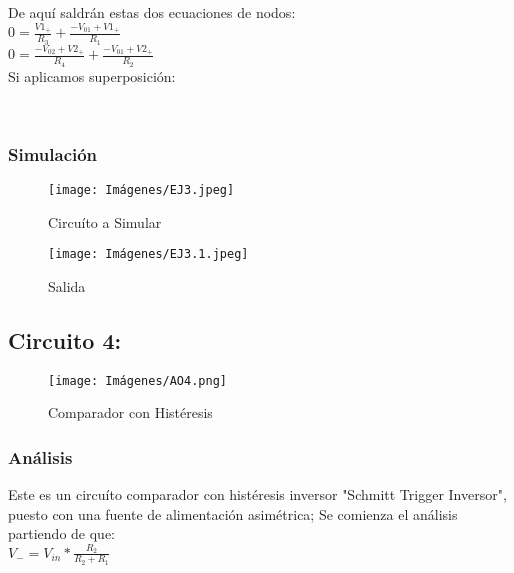         De aquí saldrán estas dos ecuaciones de nodos:\\
        
        $0 = \frac{V1_{+}}{R_{3}} + \frac{-V_{01} + V1_{+}}{R_{1}}$\\
        
        $0 = \frac{-V_{02} + V2_{+}}{R_{4}} + \frac{-V_{01} + V2_{+}}{R_{2}}$\\

        Si aplicamos superposición:\\

        \begin{center}
            \\
        \end{center}
        
        
        \subsubsection{Simulación}
        
        \begin{figure}[ht]
        	\centering
        	\texttt{[image: Imágenes/EJ3.jpeg]}
        	\caption{Circuíto a Simular}
        \end{figure}

        \begin{figure}[ht]
        	\centering
        	\texttt{[image: Imágenes/EJ3.1.jpeg]}
        	\caption{Salida}
        \end{figure}
        
        
    \subsection{Circuito 4:}
        \begin{figure}[ht]
        	\centering
        	\texttt{[image: Imágenes/AO4.png]}
        	\caption{Comparador con Histéresis}
        \end{figure}
        \subsubsection{Análisis}
        Este es un circuíto comparador con histéresis inversor "Schmitt Trigger Inversor", puesto con una fuente de alimentación asimétrica; Se comienza el análisis partiendo de que:\\

        $V_{-} = V_{in}*\frac{R_{2}}{R_{2} + R_{1}}$\\
        
